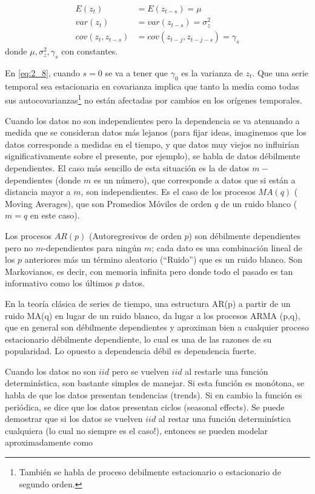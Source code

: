 \documentclass[
  12pt]{article}
\begin{document}
\begin{align}
    \label{eq:2_7}
    E(z_{t})&=E(z_{t-s})=\mu\\
    \label{eq:2_8}
    var(z_t)&=var(z_{t-s})=\sigma^2_z\\
    \label{eq:2_9}
    cov(z_t,z_{t-s})&=cov(z_{t-j},z_{t-j-s})=\gamma_s
\end{align} donde \(\mu, \sigma^2_z, \gamma_s\) con constantes.

En \eqref{eq:2_8}, cuando \(s=0\) se va a tener que \(\gamma_0\) es la
varianza de \(z_t\). Que una serie temporal sea estacionaria en
covarianza implica que tanto la media como todas sus
autocovarianzas\footnote{También se habla de proceso debilmente estacionario o estacionario de segundo orden.}
no están afectadas por cambios en los orígenes temporales.

Cuando los datos no son independientes pero la dependencia se va
atenuando a medida que se consideran datos más lejanos (para fijar
ideas, imaginemos que los datos corresponde a medidas en el tiempo, y
que datos muy viejos no influirían significativamente sobre el presente,
por ejemplo), se habla de datos débilmente dependientes. El caso más
sencillo de esta situación es la de datos \(m-\)dependientes (donde
\(m\) es un número), que corresponde a datos que si están a distancia
mayor a \(m\), son independientes. Es el caso de los procesos \(MA(q)\)
( Moving Averages), que son Promedios Móviles de orden \(q\) de un ruido
blanco (\(m=q\) en este caso).

Los procesos \(AR(p)\) (Autoregresivos de orden \(p\)) son débilmente
dependientes pero no \(m\)-dependientes para ningún \(m\); cada dato es
una combinación lineal de los \(p\) anteriores más un término aleatorio
(``Ruido'') que es un ruido blanco. Son Markovianos, es decir, con
memoria infinita pero donde todo el pasado es tan informativo como los
últimos \(p\) datos.

En la teoría clásica de series de tiempo, una estructura AR(p) a partir
de un ruido MA(q) en lugar de un ruido blanco, da lugar a los procesos
ARMA (p,q), que en general son débilmente dependientes y aproximan bien
a cualquier proceso estacionario débilmente dependiente, lo cual es una
de las razones de su popularidad. Lo opuesto a dependencia débil es
dependencia fuerte.

Cuando los datos no son \(iid\) pero se vuelven \(iid\) al restarle una
función determinística, son bastante simples de manejar. Si esta función
es monótona, se habla de que los datos presentan tendencias (trends). Si
en cambio la función es periódica, se dice que los datos presentan
ciclos (seasonal effects). Se puede demostrar que si los datos se
vuelven \(iid\) al restar una función determinística cualquiera (lo cual
no siempre es el caso!), entonces se pueden modelar aproximadamente como
\end{document}
